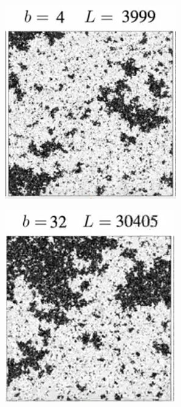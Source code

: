 \documentclass[]{article}
\begin{document}
\begin{figure}[H]
\begin{subfigure}[t]{0.3\textwidth}
		\includegraphics[width=\textwidth]{DouglasAshton3-2}
	\end{subfigure}
	\begin{subfigure}[t]{0.3\textwidth}
		\includegraphics[width=\textwidth]{DouglasAshton3-3}
	\end{subfigure}
\end{figure}
\end{document}
